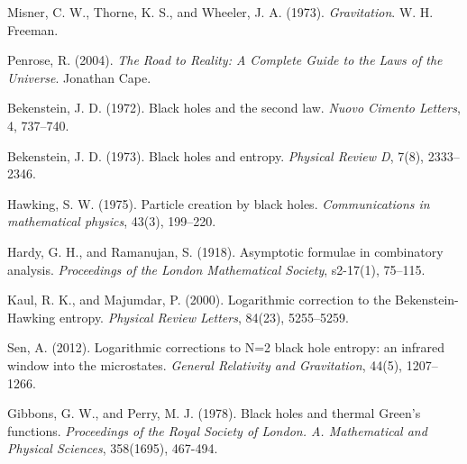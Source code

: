 \documentclass[12pt, letterpaper]{article}
\begin{document}

\begin{thebibliography}{9}

Misner, C. W., Thorne, K. S., and Wheeler, J. A. (1973). \textit{Gravitation}. W. H. Freeman.

Penrose, R. (2004). \textit{The Road to Reality: A Complete Guide to the Laws of the Universe}. Jonathan Cape.

Bekenstein, J. D. (1972). Black holes and the second law. \textit{Nuovo Cimento Letters}, 4, 737–740.

Bekenstein, J. D. (1973). Black holes and entropy. \textit{Physical Review D}, 7(8), 2333–2346.

Hawking, S. W. (1975). Particle creation by black holes. \textit{Communications in mathematical physics}, 43(3), 199–220.

Hardy, G. H., and Ramanujan, S. (1918). Asymptotic formulae in combinatory analysis. \textit{Proceedings of the London Mathematical Society}, s2-17(1), 75–115.

Kaul, R. K., and Majumdar, P. (2000). Logarithmic correction to the Bekenstein-Hawking entropy. \textit{Physical Review Letters}, 84(23), 5255–5259.

Sen, A. (2012). Logarithmic corrections to N=2 black hole entropy: an infrared window into the microstates. \textit{General Relativity and Gravitation}, 44(5), 1207–1266.

Gibbons, G. W., and Perry, M. J. (1978). Black holes and thermal Green's functions.
\textit{Proceedings of the Royal Society of London. A. Mathematical and Physical Sciences},
358(1695), 467-494.

\end{thebibliography}
\end{document}
